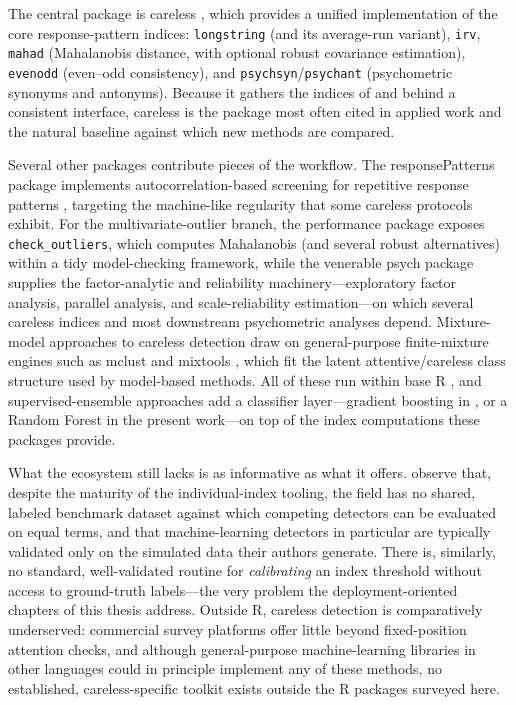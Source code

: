 \documentclass[doc,11pt,donotrepeattitle]{apa7}
\begin{document}
The central package is \textsf{careless} \parencite{yentes2023careless}, which
provides a unified implementation of the core response-pattern indices:
\texttt{longstring} (and its average-run variant), \texttt{irv}, \texttt{mahad}
(Mahalanobis distance, with optional robust covariance estimation),
\texttt{evenodd} (even--odd consistency), and \texttt{psychsyn}/\texttt{psychant}
(psychometric synonyms and antonyms). Because it gathers the indices of
\textcite{meade2012identifying} and \textcite{curran2016methods} behind a
consistent interface, \textsf{careless} is the package most often cited in
applied work and the natural baseline against which new methods are compared.

Several other packages contribute pieces of the workflow. The
\textsf{responsePatterns} package \parencite{rihacek2023responsepatterns}
implements autocorrelation-based screening for repetitive response patterns
\parencite{gottfried2022autocorrelation}, targeting the machine-like regularity
that some careless protocols exhibit. For the multivariate-outlier branch, the
\textsf{performance} package \parencite{ludecke2021performance} exposes
\texttt{check\_outliers}, which computes Mahalanobis (and several robust
alternatives) within a tidy model-checking framework, while the venerable
\textsf{psych} package \parencite{revelle2024psych} supplies the
factor-analytic and reliability machinery---exploratory factor analysis,
parallel analysis, and scale-reliability estimation---on which several careless
indices and most downstream psychometric analyses depend. Mixture-model
approaches to careless detection draw on general-purpose finite-mixture engines
such as \textsf{mclust} \parencite{scrucca2016mclust} and \textsf{mixtools}
\parencite{benaglia2009mixtools}, which fit the latent attentive/careless class
structure used by model-based methods. All of these run within base
\textsf{R} \parencite{rcoreteam2024}, and supervised-ensemble approaches add a
classifier layer---gradient boosting in \textcite{schroeders2022detecting}, or a
Random Forest in the present work---on top of the index computations these
packages provide.

What the ecosystem still lacks is as informative as what it offers.
\textcite{alfons2024openscience} observe that, despite the maturity of the
individual-index tooling, the field has no shared, labeled benchmark dataset
against which competing detectors can be evaluated on equal terms, and that
machine-learning detectors in particular are typically validated only on the
simulated data their authors generate. There is, similarly, no standard,
well-validated routine for \emph{calibrating} an index threshold without access
to ground-truth labels---the very problem the deployment-oriented chapters of
this thesis address. Outside \textsf{R}, careless detection is comparatively
underserved: commercial survey platforms offer little beyond fixed-position
attention checks, and although general-purpose machine-learning libraries in
other languages could in principle implement any of these methods, no
established, careless-specific toolkit exists outside the \textsf{R} packages
surveyed here.
\end{document}
